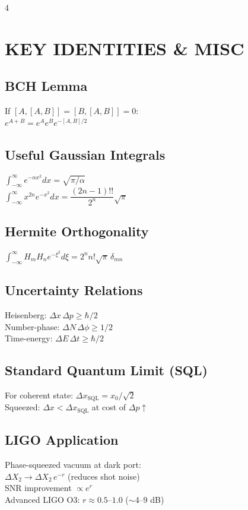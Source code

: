 \documentclass[10pt,landscape,a4paper]{article}
\newcommand{\xzero}{x_0}
\begin{document}
\begin{multicols}{4}
\section{KEY IDENTITIES \& MISC}

\subsection{BCH Lemma}
If $[A,[A,B]] = [B,[A,B]] = 0$:\\
$e^{A+B} = e^A e^B e^{-[A,B]/2}$

\subsection{Useful Gaussian Integrals}
$\int_{-\infty}^{\infty} e^{-\alpha x^2}dx = \sqrt{\pi/\alpha}$\\[2pt]
$\int_{-\infty}^{\infty} x^{2n}e^{-x^2}dx = \dfrac{(2n-1)!!}{2^n}\sqrt{\pi}$

\subsection{Hermite Orthogonality}
$\int_{-\infty}^{\infty} H_m H_n e^{-\xi^2}d\xi = 2^n n!\sqrt{\pi}\,\delta_{mn}$

\subsection{Uncertainty Relations}
Heisenberg: $\Delta x\,\Delta p \geq \hbar/2$\\
Number-phase: $\Delta N\,\Delta\phi \geq 1/2$\\
Time-energy: $\Delta E\,\Delta t \geq \hbar/2$

\subsection{Standard Quantum Limit (SQL)}
For coherent state: $\Delta x_{\text{SQL}} = \xzero/\sqrt{2}$\\
Squeezed: $\Delta x < \Delta x_{\text{SQL}}$ at cost of $\Delta p \uparrow$

\subsection{LIGO Application}
Phase-squeezed vacuum at dark port:\\
$\Delta X_2 \to \Delta X_2\,e^{-r}$ \quad (reduces shot noise)\\
SNR improvement $\propto e^r$\\
Advanced LIGO O3: $r\approx 0.5$--$1.0$ ($\sim$4--9 dB)


\end{multicols}
\end{document}
